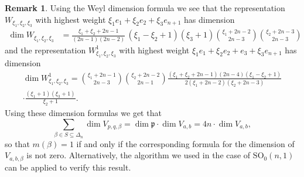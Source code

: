 \documentclass[JEP,XML,SOM,NoFloatCountersInSection,Unicode,published]{cedram}
\theoremstyle{definition}
\newtheorem{remark}[theorem]{Remark}
\newcommand{\mf}[1]{\ensuremath{\mathfrak{#1}}}
\newcommand{\GSO}[1]{\ensuremath{\mathrm{SO}_0(#1,1)}}
\begin{document}
\begin{remark}\label{rem:dim_H}
Using the Weyl dimension formula we see that the representation $W_{\xi_1,\xi_2,\xi_3}$ with highest weight $\xi_1e_1+\xi_2e_2+\xi_3e_{n+1}$ has dimension
\begin{align*}
\dim W_{\xi_1,\xi_2,\xi_3}&=\frac{\xi_1+\xi_2+2n-1}{(2n-1)(2n-2)}\,(\xi_1-\xi_2+1)(\xi_3+1)\binom{\xi_1+2n-2}{2n-3}\binom{\xi_2+2n-3}{2n-3}
\end{align*}
and the representation $W^1_{\xi_1,\xi_2,\xi_3}$ with highest weight $\xi_1e_1+\xi_2e_2+e_3+\xi_3e_{n+1}$ has dimension
\begin{multline*}
\dim W^1_{\xi_1,\xi_2,\xi_3}=\binom{\xi_1+2n-1}{2n-3}\binom{\xi_2+2n-2}{2n-1}\frac{(\xi_1+\xi_2+2n-1)(2n-4)(\xi_1-\xi_2+1)}{2(\xi_1+2n-2)(\xi_2+2n-3)}\\
\cdot\frac{(\xi_1+1)(\xi_3+1)}{\xi_2+1}.
\end{multline*}
Using these dimension formulas we get that
\[
\sum_{\beta\in S\subseteq\Delta_n}\dim V_{p,q,\beta}=\dim\mf p\cdot\dim V_{a,b}=4n\cdot\dim V_{a,b},
\]
so that $m(\beta)=1$ if and only if the corresponding formula for the dimension of $V_{a,b,\beta}$ is not zero. Alternatively, the algorithm we used in the case of $\GSO{n}$ can be applied to verify this result.
\end{remark}
\end{document}

